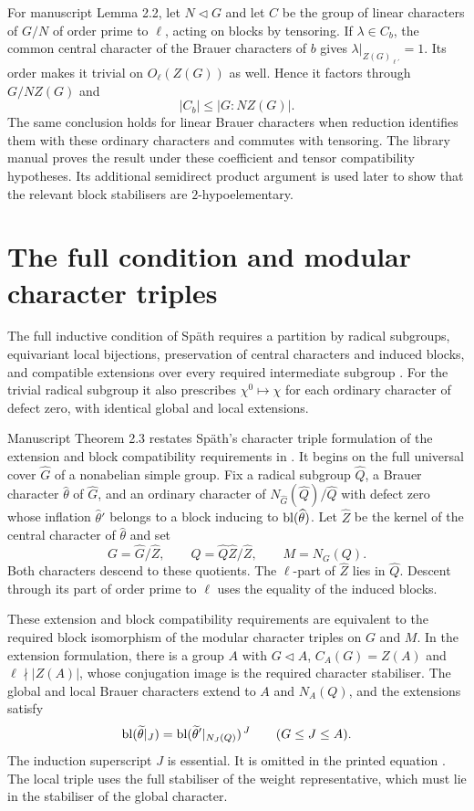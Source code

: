 For manuscript Lemma 2.2, let $N\lhd G$ and let $C$ be the group of
linear characters of $G/N$ of order prime to $\ell$, acting on
blocks by tensoring. If $\lambda\in C_b$, the common central
character of the Brauer characters of $b$ gives
$\lambda|_{Z(G)_{\ell'}}=1$. Its order makes it trivial on
$O_\ell(Z(G))$ as well. Hence it factors through $G/NZ(G)$ and
\[
 |C_b|\leq |G:NZ(G)|.
\]
The same conclusion holds for linear Brauer characters when
reduction identifies them with these ordinary characters and
commutes with tensoring. The library manual proves the result
under these coefficient and tensor compatibility hypotheses.
Its additional semidirect product argument is used later to show
that the relevant block stabilisers are $2$-hypoelementary.

\section{The full condition and modular character triples}

The full inductive condition of Sp\"ath requires a partition by
radical subgroups, equivariant local bijections, preservation of
central characters and induced blocks, and compatible extensions
over every required intermediate subgroup
\cite[Definition~4.1]{Spath2013}. For the trivial radical subgroup
it also prescribes $\chi^0\mapsto\chi$ for each ordinary character
of defect zero, with identical global and local extensions.

Manuscript Theorem 2.3 restates Sp\"ath's character triple
formulation \cite[Theorem~4.4]{Spath2017Triples} of the extension
and block compatibility requirements in
\cite[Definition~4.1(iii)]{Spath2013}. It begins on the full
universal cover $\widehat G$ of a nonabelian simple group.
Fix a radical subgroup $\widehat Q$, a Brauer character
$\widehat\theta$ of $\widehat G$, and an ordinary character of
$N_{\widehat G}(\widehat Q)/\widehat Q$ with defect zero whose
inflation $\widehat\theta'$ belongs to a block inducing to
$\operatorname{bl}(\widehat\theta)$. Let $\widehat Z$ be the kernel of the
central character of $\widehat\theta$ and set
\[
 G=\widehat G/\widehat Z,\qquad
 Q=\widehat Q\widehat Z/\widehat Z,\qquad M=N_G(Q).
\]
Both characters descend to these quotients. The $\ell$-part of
$\widehat Z$ lies in $\widehat Q$. Descent through its part of order
prime to $\ell$ uses the equality of the induced blocks.

These extension and block compatibility requirements are
equivalent to the required block isomorphism of the modular
character triples on $G$ and $M$. In the extension formulation,
there is a group $A$ with $G\lhd A$,
$C_A(G)=Z(A)$ and $\ell\nmid|Z(A)|$, whose conjugation image is
the required character stabiliser. The global and local Brauer
characters extend to $A$ and $N_A(Q)$, and the extensions satisfy
\[
 \operatorname{bl}(\widetilde\theta|_J)
 =\operatorname{bl}(\widetilde\theta'|_{N_J(Q)})^{\,J}
 \qquad(G\leq J\leq A).
\]
The induction superscript $J$ is essential. It is omitted in the printed equation \cite[(12)]{Spath2017Triples}.
The local triple uses the full stabiliser of the weight representative,
which must lie in the stabiliser of the global character.

